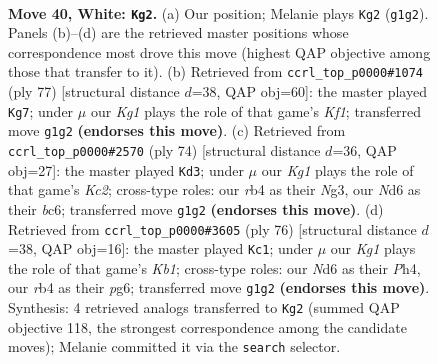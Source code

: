\documentclass[11pt]{article}
\begin{document}
\clearpage

\begin{figure}[p]\centering
\begin{subfigure}{0.46\textwidth}\centering
\resizebox{\linewidth}{!}{%
\newchessgame
\chessboard[
  setfen={6R1/6p1/3Nppk1/1p5p/1r1P1P1P/4P1P1/8/6K1 w - - 0 40},
  showmover=false,
  pgfstyle=straightmove, color=movearrow, markmove={g1-g2}
]}
\caption{}
\end{subfigure}\hfill
\begin{subfigure}{0.46\textwidth}\centering
\resizebox{\linewidth}{!}{%
\newchessgame
\chessboard[
  setfen={5k2/5p2/5Rp1/3Pp2p/4P2P/5PK1/3r3P/8 b - - 6 39},
  showmover=false,
  pgfstyle=straightmove, color=movearrow, markmove={f8-g7}
]}
\caption{}
\end{subfigure}
\\[4pt]
\begin{subfigure}{0.46\textwidth}\centering
\resizebox{\linewidth}{!}{%
\newchessgame
\chessboard[
  setfen={r7/8/2b1kpp1/p3p2p/2P4P/1P3PN1/2K3P1/R7 w - - 2 38},
  showmover=false,
  pgfstyle=straightmove, color=movearrow, markmove={c2-d3}
]}
\caption{}
\end{subfigure}\hfill
\begin{subfigure}{0.46\textwidth}\centering
\resizebox{\linewidth}{!}{%
\newchessgame
\chessboard[
  setfen={8/1r3p1R/4k1p1/2p1p3/2p1P2P/2P2P2/2P3P1/1K6 w - - 3 39},
  showmover=false,
  pgfstyle=straightmove, color=movearrow, markmove={b1-c1}
]}
\caption{}
\end{subfigure}
\caption{\textbf{Move 40, White: \texttt{Kg2}.} (a) Our position; Melanie plays \texttt{Kg2} (\texttt{g1g2}). Panels (b)--(d) are the retrieved master positions whose correspondence most drove this move (highest QAP objective among those that transfer to it). (b) Retrieved from \texttt{ccrl\_top\_p0000\#1074} (ply 77) [structural distance $d$=38, QAP obj=60]: the master played \texttt{Kg7}; under $\mu$ our \emph{Kg1} plays the role of that game's \emph{Kf1}; transferred move \texttt{g1g2} \textbf{(endorses this move)}. (c) Retrieved from \texttt{ccrl\_top\_p0000\#2570} (ply 74) [structural distance $d$=36, QAP obj=27]: the master played \texttt{Kd3}; under $\mu$ our \emph{Kg1} plays the role of that game's \emph{Kc2}; cross-type roles: our \emph{r}b4 as their \emph{N}g3, our \emph{N}d6 as their \emph{b}c6; transferred move \texttt{g1g2} \textbf{(endorses this move)}. (d) Retrieved from \texttt{ccrl\_top\_p0000\#3605} (ply 76) [structural distance $d$=38, QAP obj=16]: the master played \texttt{Kc1}; under $\mu$ our \emph{Kg1} plays the role of that game's \emph{Kb1}; cross-type roles: our \emph{N}d6 as their \emph{P}h4, our \emph{r}b4 as their \emph{p}g6; transferred move \texttt{g1g2} \textbf{(endorses this move)}. Synthesis: 4 retrieved analogs transferred to \texttt{Kg2} (summed QAP objective 118, the strongest correspondence among the candidate moves); Melanie committed it via the \texttt{search} selector.}
\label{fig:thought-m78}
\end{figure}
\end{document}

